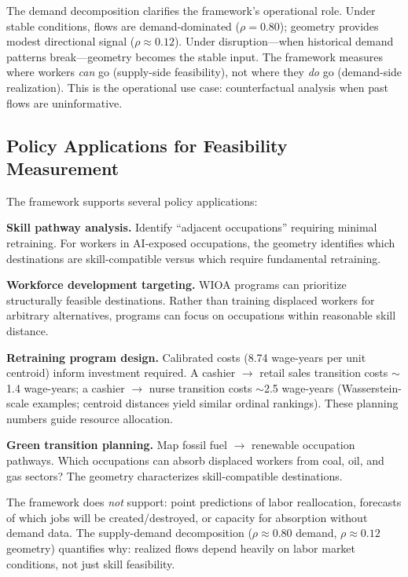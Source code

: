 \documentclass[12pt]{article}
\begin{document}
The demand decomposition clarifies the framework's operational role. Under stable conditions, flows are demand-dominated ($\rho = 0.80$); geometry provides modest directional signal ($\rho \approx 0.12$). Under disruption---when historical demand patterns break---geometry becomes the stable input. The framework measures where workers \emph{can} go (supply-side feasibility), not where they \emph{do} go (demand-side realization). This is the operational use case: counterfactual analysis when past flows are uninformative.


\subsection{Policy Applications for Feasibility Measurement}
\label{subsec:policy-applications}


The framework supports several policy applications:

\textbf{Skill pathway analysis.} Identify ``adjacent occupations'' requiring minimal retraining. For workers in AI-exposed occupations, the geometry identifies which destinations are skill-compatible versus which require fundamental retraining.

\textbf{Workforce development targeting.} WIOA programs can prioritize structurally feasible destinations. Rather than training displaced workers for arbitrary alternatives, programs can focus on occupations within reasonable skill distance.

\textbf{Retraining program design.} Calibrated costs (8.74 wage-years per unit centroid) inform investment required. A cashier $\to$ retail sales transition costs $\sim$1.4 wage-years; a cashier $\to$ nurse transition costs $\sim$2.5 wage-years (Wasserstein-scale examples; centroid distances yield similar ordinal rankings). These planning numbers guide resource allocation.

\textbf{Green transition planning.} Map fossil fuel $\to$ renewable occupation pathways. Which occupations can absorb displaced workers from coal, oil, and gas sectors? The geometry characterizes skill-compatible destinations.

The framework does \emph{not} support: point predictions of labor reallocation, forecasts of which jobs will be created/destroyed, or capacity for absorption without demand data. The supply-demand decomposition ($\rho \approx 0.80$ demand, $\rho \approx 0.12$ geometry) quantifies why: realized flows depend heavily on labor market conditions, not just skill feasibility.
\end{document}

